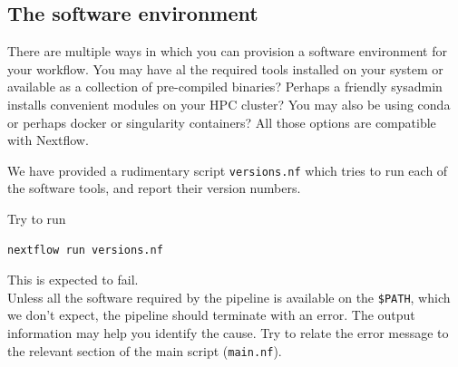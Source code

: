 \subsection{The software environment}

There are multiple ways in which you can provision a software environment for your workflow.
You may have al the required tools installed on your system or available as a collection of pre-compiled binaries? Perhaps a friendly sysadmin installs convenient modules on your HPC cluster? You may also be using conda or perhaps docker or singularity containers? All those options are compatible with Nextflow. 

We have provided a rudimentary script \texttt{versions.nf} which tries to run each of the software tools,
and report their version numbers. 


\begin{steps}
Try to run
\begin{lstlisting}
nextflow run versions.nf
\end{lstlisting}
\end{steps}

\begin{warning}
This is expected to fail.\\
Unless all the software required by the pipeline is available on the \texttt{\$PATH},
which we don't expect, the pipeline should terminate with an error.
The output information may help you identify the cause. 
Try to relate the error message to the relevant section of the main script (\texttt{main.nf}). 
\end{warning}


